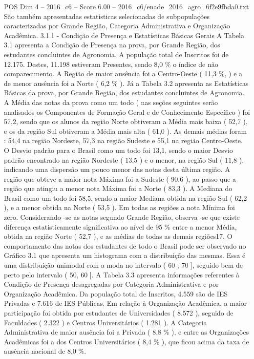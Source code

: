 \begin{textsample}{POS Dim 4 – 2016\_c6 – Score 6.00 – 2016\_c6/enade\_2016\_agro\_6f2e9fbda0.txt}
São também apresentadas estatísticas selecionadas de subpopulações caracterizadas por Grande Região, Categoria Administrativa e Organização Acadêmica. 3.1.1 - Condição de Presença e Estatísticas Básicas Gerais A Tabela 3.1 apresenta a Condição de Presença na prova, por Grande Região, dos estudantes concluintes de Agronomia.
A população total de Inscritos foi de 12.175.
Destes, 11.198 estiveram Presentes, sendo 8,0 \% o índice de não comparecimento.
A Região de maior ausência foi a Centro-Oeste ( 11,3 \%, ) e a de menor ausência foi a Norte ( 6,2 \% ).
Já a Tabela 3.2 apresenta as Estatísticas Básicas da prova, por Grande Região, dos estudantes concluintes de Agronomia.
A Média das notas da prova como um todo ( nas seções seguintes serão analisados os Componentes de Formação Geral e de Conhecimento Específico ) foi 57,2, sendo que os alunos da região Norte obtiveram a Média mais baixa ( 52,7 ), e os da região Sul obtiveram a Média mais alta ( 61,0 ).
As demais médias foram : 54,4 na região Nordeste, 57,3 na região Sudeste e 55,1 na região Centro-Oeste.
O Desvio padrão para o Brasil como um todo foi 13,1, sendo o maior Desvio padrão encontrado na região Nordeste ( 13,5 ) e o menor, na região Sul ( 11,8 ), indicando uma dispersão um pouco menor das notas desta última região.
A região que obteve a maior nota Máxima foi a Sudeste ( 90,6 ), ao passo que a região que atingiu a menor nota Máxima foi a Norte ( 83,3 ).
A Mediana do Brasil como um todo foi 58,5, sendo a maior Mediana obtida na região Sul ( 62,2 ), e a menor obtida na Norte ( 53,5 ).
Em todas as regiões a nota Mínima foi zero.
Considerando -se as notas segundo Grande Região, observa -se que existe diferença estatisticamente significativa ao nível de 95 \% entre a menor Média, obtida na região Norte ( 52,7 ), e as médias de todas as demais regiões17.
O comportamento das notas dos estudantes de todo o Brasil pode ser observado no Gráfico 3.1 que apresenta um histograma com a distribuição das mesmas.
Essa é uma distribuição unimodal com a moda no intervalo ( 60 ; 70 ], seguido bem de perto pelo intervalo ( 50, 60 ].
A Tabela 3.3 apresenta informações referentes à Condição de Presença desagregadas por Categoria Administrativa e por Organização Acadêmica.
Da população total de Inscritos, 4.559 são de IES Privadas e 7.616 de IES Públicas.
Em relação à Organização Acadêmica, a maior participação foi obtida por estudantes de Universidades ( 8.572 ), seguido de Faculdades ( 2.322 ) e Centros Universitários ( 1.281 ).
A Categoria Administrativa de maior ausência foi a Privada ( 8,8 \% ), e entre as Organizações Acadêmicas foi a dos Centros Universitários ( 8,4 \% ), que ficou acima da taxa de ausência nacional de 8,0 \%.

\end{textsample}
